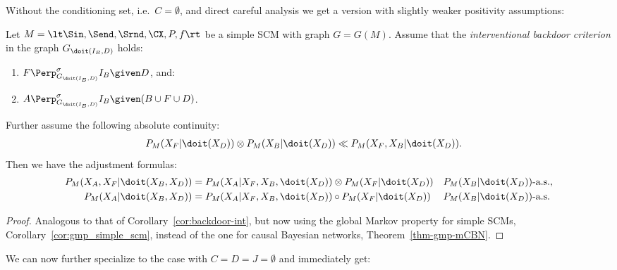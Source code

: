 Without the conditioning set, i.e.\ $C=\emptyset$, and direct careful analysis we get a version with slightly weaker positivity assumptions:
\begin{Thm}\label{thm:backdoor-int-scms}
  Let $M = \lt \Sin, \Send, \Srnd, \CX, P, f \rt$ be a simple SCM with graph $G = G(M)$. %
  Assume that the \emph{interventional backdoor criterion} in the graph $G_{\doit(I_B,D)}$ holds:
  \begin{enumerate}
    \item $\displaystyle F \Perp^\sigma_{G_{\doit(I_B,D)}} I_B  \given D$, and:
    \item $\displaystyle A \Perp^\sigma_{G_{\doit(I_B,D)}} I_B  \given (B \cup F \cup D)$.
  \end{enumerate}
  Further assume the following absolute continuity:
  \begin{align*}
      P_M(X_F|\doit(X_D)) \otimes P_M(X_B|\doit(X_D)) &\ll  P_M(X_F,X_B|\doit(X_D)).
  \end{align*}
  Then we have the adjustment formulas: 
  \begin{align*}
    P_M(X_A,X_F|\doit(X_B,X_D)) &= P_M(X_A|X_F,X_B,\doit(X_D)) \otimes P_M(X_F|\doit(X_D)) && P_M(X_B|\doit(X_D))\text{-a.s.}, \\
    P_M(X_A|\doit(X_B,X_D)) &= P_M(X_A|X_F,X_B,\doit(X_D)) \circ P_M(X_F|\doit(X_D)) && P_M(X_B|\doit(X_D))\text{-a.s.}
  \end{align*}
\end{Thm}
\begin{proof}
  Analogous to that of Corollary~\ref{cor:backdoor-int}, but now using
  the global Markov property for simple SCMs, Corollary~\ref{cor:gmp_simple_scm}, 
  instead of the one for causal Bayesian networks, Theorem~\ref{thm-gmp-mCBN}. 
\end{proof}
We can now further specialize to the case with $C=D=J= \emptyset$ and immediately get:
